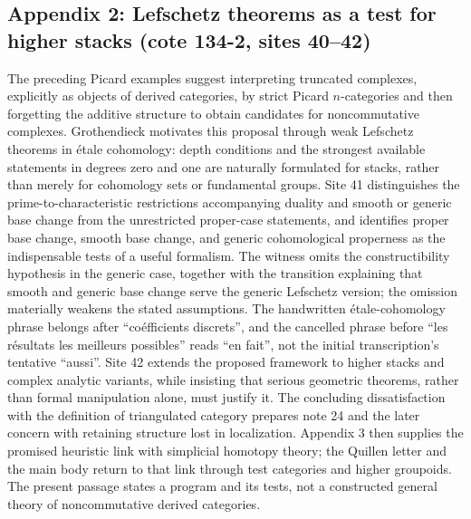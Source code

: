 \subsection*{Appendix 2: Lefschetz theorems as a test for higher stacks (cote 134-2, sites 40--42)}
The preceding Picard examples suggest interpreting truncated complexes, explicitly as objects of derived categories, by strict Picard $n$-categories and then forgetting the additive structure to obtain candidates for noncommutative complexes. Grothendieck motivates this proposal through weak Lefschetz theorems in étale cohomology: depth conditions and the strongest available statements in degrees zero and one are naturally formulated for stacks, rather than merely for cohomology sets or fundamental groups. Site 41 distinguishes the prime-to-characteristic restrictions accompanying duality and smooth or generic base change from the unrestricted proper-case statements, and identifies proper base change, smooth base change, and generic cohomological properness as the indispensable tests of a useful formalism. The witness omits the constructibility hypothesis in the generic case, together with the transition explaining that smooth and generic base change serve the generic Lefschetz version; the omission materially weakens the stated assumptions. The handwritten étale-cohomology phrase belongs after ``coéfficients discrets'', and the cancelled phrase before ``les résultats les meilleurs possibles'' reads ``en fait'', not the initial transcription's tentative ``aussi''. Site 42 extends the proposed framework to higher stacks and complex analytic variants, while insisting that serious geometric theorems, rather than formal manipulation alone, must justify it. The concluding dissatisfaction with the definition of triangulated category prepares note 24 and the later concern with retaining structure lost in localization. Appendix 3 then supplies the promised heuristic link with simplicial homotopy theory; the Quillen letter and the main body return to that link through test categories and higher groupoids. The present passage states a program and its tests, not a constructed general theory of noncommutative derived categories.

